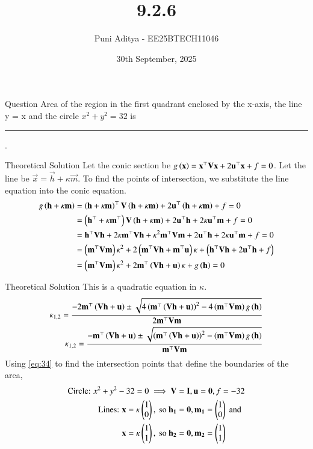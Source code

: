 \documentclass{beamer}
\title{9.2.6}
\date{30th September, 2025}
\author{Puni Aditya - EE25BTECH11046}
\begin{document}
\frame{\titlepage}
\begin{frame}{Question}
Area of the region in the first quadrant enclosed by the x-axis, the line y = x and the circle $x^2 + y^2 = 32$ is \rule{2cm}{0.4pt}.
\end{frame}

\begin{frame}{Theoretical Solution}
Let the conic section be $g\left(\mathbf{x}\right) = \mathbf{x}^\top\mathbf{V}\mathbf{x} + 2\mathbf{u}^\top\mathbf{x} + f = 0$.
Let the line be $\vec{x} = \vec{h} + \kappa\vec{m}$.
To find the points of intersection, we substitute the line equation into the conic equation.
\begin{align}
    g\left(\mathbf{h}+\kappa\mathbf{m}\right) &= \left(\mathbf{h}+\kappa\mathbf{m}\right)^\top\mathbf{V}\left(\mathbf{h}+\kappa\mathbf{m}\right) + 2\mathbf{u}^\top\left(\mathbf{h}+\kappa\mathbf{m}\right) + f = 0 \\
    &= \left(\mathbf{h}^\top + \kappa\mathbf{m}^\top\right)\mathbf{V}\left(\mathbf{h}+\kappa\mathbf{m}\right) + 2\mathbf{u}^\top\mathbf{h} + 2\kappa\mathbf{u}^\top\mathbf{m} + f = 0 \\
    &= \mathbf{h}^\top\mathbf{V}\mathbf{h} + 2\kappa\mathbf{m}^\top\mathbf{V}\mathbf{h} + \kappa^2\mathbf{m}^\top\mathbf{V}\mathbf{m} + 2\mathbf{u}^\top\mathbf{h} + 2\kappa\mathbf{u}^\top\mathbf{m} + f = 0 \\
    &= \left(\mathbf{m}^\top\mathbf{V}\mathbf{m}\right)\kappa^2 + 2\left(\mathbf{m}^\top\mathbf{V}\mathbf{h} + \mathbf{m}^\top\mathbf{u}\right)\kappa + \left(\mathbf{h}^\top\mathbf{V}\mathbf{h} + 2\mathbf{u}^\top\mathbf{h} + f\right) \\
    &= \left(\mathbf{m}^\top\mathbf{V}\mathbf{m}\right)\kappa^2 + 2\mathbf{m}^\top\left(\mathbf{V}\mathbf{h} + \mathbf{u}\right)\kappa + g\left(\mathbf{h}\right) = 0
\end{align}
\end{frame}

\begin{frame}{Theoretical Solution}
This is a quadratic equation in $\kappa$.
\begin{align}
    \kappa_{1,2} = \frac{-2\mathbf{m}^\top\left(\mathbf{V}\mathbf{h}+\mathbf{u}\right) \pm \sqrt{4\left(\mathbf{m}^\top\left(\mathbf{V}\mathbf{h}+\mathbf{u}\right)\right)^2 - 4\left(\mathbf{m}^\top\mathbf{V}\mathbf{m}\right)g\left(\mathbf{h}\right)}}{2\mathbf{m}^\top\mathbf{V}\mathbf{m}} \\
    \kappa_{1,2} = \frac{-\mathbf{m}^\top\left(\mathbf{V}\mathbf{h}+\mathbf{u}\right) \pm \sqrt{\left(\mathbf{m}^\top\left(\mathbf{V}\mathbf{h}+\mathbf{u}\right)\right)^2 - \left(\mathbf{m}^\top\mathbf{V}\mathbf{m}\right)g\left(\mathbf{h}\right)}}{\mathbf{m}^\top\mathbf{V}\mathbf{m}} \label{eq:34}
\end{align}
Using \eqref{eq:34} to find the intersection points that define the boundaries of the area,
\begin{align*}
    \text{Circle: } x^2+y^2-32 = 0 \implies \mathbf{V}&=\mathbf{I}, \mathbf{u}=\mathbf{0}, f=-32 \\
    \text{Lines: } \mathbf{x} = \kappa\begin{pmatrix}1 \\ 0\end{pmatrix},\text{ so } \mathbf{h_1}&=\mathbf{0}, \mathbf{m_1}=\begin{pmatrix}1 \\ 0\end{pmatrix}\text{ and } \\ \mathbf{x} = \kappa\begin{pmatrix}1 \\ 1\end{pmatrix},\text{ so } \mathbf{h_2}&=\mathbf{0}, \mathbf{m_2}=\begin{pmatrix}1 \\ 1\end{pmatrix}
\end{align*}
\end{frame}
\end{document}
